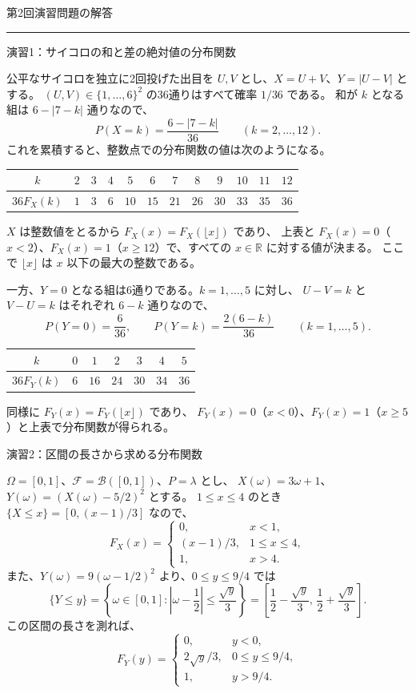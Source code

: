 \documentclass[a4paper,10pt,pdflatex,ja=standard,jafont=ipaex-type1,
  magstyle=real,scale=1]{bxjsarticle}
\newcommand{\coursename}{確率論と統計学 I}
\newcommand{\topic}[1]{\par\vspace{5pt}
  {\large\sffamily\mdseries\color{accent}#1}\par\vspace{2pt}}
\newcommand{\handouttitle}[1]{\begin{center}
  {\Large\color{ink}#1}\par\vspace{3mm}
  {\color{accent}\rule{0.88\linewidth}{0.7pt}}
  \end{center}\vspace{-2mm}}
\newcommand{\F}{\mathcal F}
\newcommand{\R}{\mathbb R}
\begin{document}
\fontsize{10pt}{13.5pt}\selectfont
\begingroup
\fancyhead[L]{\small\color{ink}\coursename{}・前回の演習解答}
\handouttitle{第2回\quad 演習問題の解答}

\topic{演習1：サイコロの和と差の絶対値の分布関数}
公平なサイコロを独立に2回投げた出目を $U,V$ とし、$X=U+V$、$Y=|U-V|$ とする。
$(U,V)\in\{1,\ldots,6\}^2$ の36通りはすべて確率 $1/36$ である。
和が $k$ となる組は $6-|7-k|$ 通りなので、
$$
  P(X=k)=\frac{6-|7-k|}{36}\qquad(k=2,\ldots,12).
$$
これを累積すると、整数点での分布関数の値は次のようになる。
\begin{center}
\begin{tabular}{@{}c*{11}{c}@{}}
\toprule
$k$ & $2$ & $3$ & $4$ & $5$ & $6$ & $7$ & $8$ & $9$ & $10$ & $11$ & $12$ \\
\midrule
$36F_X(k)$ & $1$ & $3$ & $6$ & $10$ & $15$ & $21$ & $26$ & $30$ & $33$ & $35$ & $36$ \\
\bottomrule
\end{tabular}
\end{center}
$X$ は整数値をとるから $F_X(x)=F_X(\lfloor x\rfloor)$ であり、
上表と $F_X(x)=0$（$x<2$）、$F_X(x)=1$（$x\ge12$）で、すべての $x\in\R$ に対する値が決まる。
ここで $\lfloor x\rfloor$ は $x$ 以下の最大の整数である。

一方、$Y=0$ となる組は6通りである。$k=1,\ldots,5$ に対し、
$U-V=k$ と $V-U=k$ はそれぞれ $6-k$ 通りなので、
$$
  P(Y=0)=\frac6{36},\qquad
  P(Y=k)=\frac{2(6-k)}{36}\qquad(k=1,\ldots,5).
$$
\begin{center}
\begin{tabular}{@{}c*{6}{c}@{}}
\toprule
$k$ & $0$ & $1$ & $2$ & $3$ & $4$ & $5$ \\
\midrule
$36F_Y(k)$ & $6$ & $16$ & $24$ & $30$ & $34$ & $36$ \\
\bottomrule
\end{tabular}
\end{center}
同様に $F_Y(x)=F_Y(\lfloor x\rfloor)$ であり、
$F_Y(x)=0$（$x<0$）、$F_Y(x)=1$（$x\ge5$）と上表で分布関数が得られる。

\topic{演習2：区間の長さから求める分布関数}
$\Omega=[0,1]$、$\F=\mathcal B([0,1])$、$P=\lambda$ とし、
$X(\omega)=3\omega+1$、$Y(\omega)=(X(\omega)-5/2)^2$ とする。
$1\le x\le4$ のとき $\{X\le x\}=[0,(x-1)/3]$ なので、
$$
  F_X(x)=
  \begin{cases}
    0, & x<1,\\
    (x-1)/3, & 1\le x\le4,\\
    1, & x>4.
  \end{cases}
$$
また、$Y(\omega)=9(\omega-1/2)^2$ より、$0\le y\le9/4$ では
$$
  \{Y\le y\}
  =\left\{\omega\in[0,1]:\left|\omega-\frac12\right|\le\frac{\sqrt y}{3}\right\}
  =\left[\frac12-\frac{\sqrt y}{3},\,\frac12+\frac{\sqrt y}{3}\right].
$$
この区間の長さを測れば、
$$
  F_Y(y)=
  \begin{cases}
    0, & y<0,\\
    2\sqrt y/3, & 0\le y\le9/4,\\
    1, & y>9/4.
  \end{cases}
$$
\clearpage
\endgroup
\end{document}
